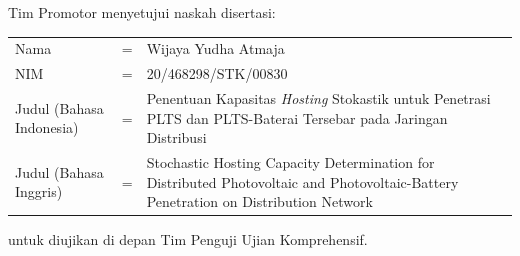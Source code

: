 {}
\vspace*{8pt}

\BgThispage

\noindent Tim Promotor menyetujui naskah disertasi:
\vspace*{-8pt}
{
\begin{longtable}{llp{264pt}}
	\hspace*{-11pt}Nama						& = & Wijaya Yudha Atmaja\\
	\hspace*{-11pt}NIM						& = & 20/468298/STK/00830\\
	\hspace*{-11pt}Judul (Bahasa Indonesia)	& = & Penentuan Kapasitas \textit{Hosting} Stokastik untuk Penetrasi PLTS dan PLTS-Baterai Tersebar pada Jaringan Distribusi\\
	\hspace*{-11pt}Judul	(Bahasa Inggris) 	& = & Stochastic Hosting Capacity Determination for Distributed Photovoltaic and Photovoltaic-Battery Penetration on Distribution Network
\end{longtable}
}
\vspace*{-22pt}
\noindent untuk diujikan di depan Tim Penguji Ujian Komprehensif.
\vspace*{5cm}

